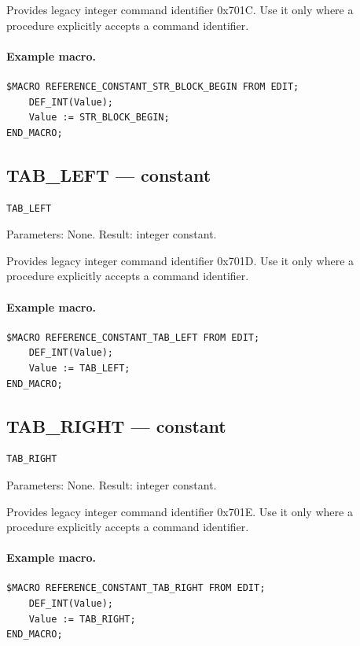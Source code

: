 \documentclass[a4paper,10pt,twoside,openany]{book}
\begin{document}
Provides legacy integer command identifier 0x701C. Use it only where a procedure explicitly accepts a command identifier.

\paragraph{Example macro.}
\begin{verbatim}
$MACRO REFERENCE_CONSTANT_STR_BLOCK_BEGIN FROM EDIT;
    DEF_INT(Value);
    Value := STR_BLOCK_BEGIN;
END_MACRO;
\end{verbatim}

\label{prim:constant-tab-left}
\subsection*{TAB\_LEFT --- constant}
\begin{verbatim}
TAB_LEFT
\end{verbatim}
Parameters: None. Result: integer constant.

Provides legacy integer command identifier 0x701D. Use it only where a procedure explicitly accepts a command identifier.

\paragraph{Example macro.}
\begin{verbatim}
$MACRO REFERENCE_CONSTANT_TAB_LEFT FROM EDIT;
    DEF_INT(Value);
    Value := TAB_LEFT;
END_MACRO;
\end{verbatim}

\label{prim:constant-tab-right}
\subsection*{TAB\_RIGHT --- constant}
\begin{verbatim}
TAB_RIGHT
\end{verbatim}
Parameters: None. Result: integer constant.

Provides legacy integer command identifier 0x701E. Use it only where a procedure explicitly accepts a command identifier.

\paragraph{Example macro.}
\begin{verbatim}
$MACRO REFERENCE_CONSTANT_TAB_RIGHT FROM EDIT;
    DEF_INT(Value);
    Value := TAB_RIGHT;
END_MACRO;
\end{verbatim}
\end{document}
